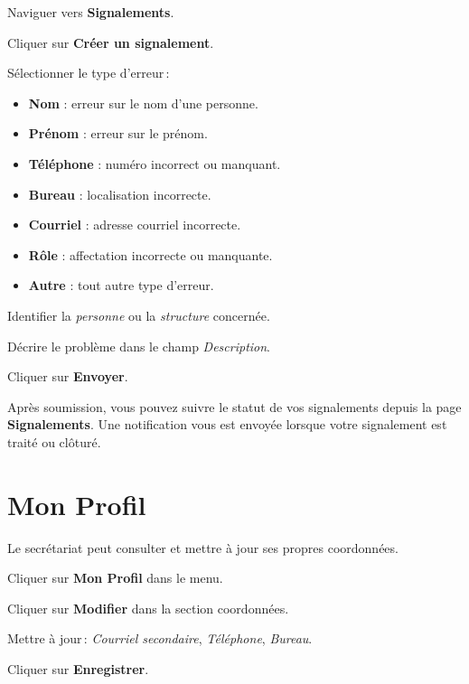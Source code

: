 \begin{steps}
  \item Naviguer vers \textbf{Signalements}.
  \item Cliquer sur \textbf{Cr\'eer un signalement}.
  \item S\'electionner le type d'erreur\,:
    \begin{itemize}
      \item \textbf{Nom} : erreur sur le nom d'une personne.
      \item \textbf{Pr\'enom} : erreur sur le pr\'enom.
      \item \textbf{T\'el\'ephone} : num\'ero incorrect ou manquant.
      \item \textbf{Bureau} : localisation incorrecte.
      \item \textbf{Courriel} : adresse courriel incorrecte.
      \item \textbf{R\^ole} : affectation incorrecte ou manquante.
      \item \textbf{Autre} : tout autre type d'erreur.
    \end{itemize}
  \item Identifier la \textit{personne} ou la \textit{structure} concern\'ee.
  \item D\'ecrire le probl\`eme dans le champ \textit{Description}.
  \item Cliquer sur \textbf{Envoyer}.
\end{steps}


\begin{tipbox}
  Apr\`es soumission, vous pouvez suivre le statut de vos signalements depuis la page \textbf{Signalements}. Une notification vous est envoy\'ee lorsque votre signalement est trait\'e ou cl\^otur\'e.
\end{tipbox}

\section{Mon Profil}

Le secr\'etariat peut consulter et mettre \`a jour ses propres coordonn\'ees.

\begin{steps}
  \item Cliquer sur \textbf{Mon Profil} dans le menu.
  \item Cliquer sur \textbf{Modifier} dans la section coordonn\'ees.
  \item Mettre \`a jour\,: \textit{Courriel secondaire}, \textit{T\'el\'ephone}, \textit{Bureau}.
  \item Cliquer sur \textbf{Enregistrer}.
\end{steps}
